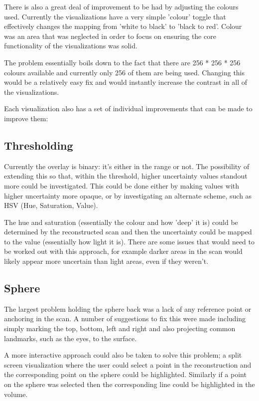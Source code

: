 There is also a great deal of improvement to be had by adjusting the colours used. Currently the visualizations have a very simple 'colour' toggle that effectively changes the mapping from 'white to black' to 'black to red'. Colour was an area that was neglected in order to focus on ensuring the core functionality of the visualizations was solid.

The problem essentially boils down to the fact that there are 256 * 256 * 256 colours available and currently only 256 of them are being used. Changing this would be a relatively easy fix and would instantly increase the contrast in all of the visualizations.

Each visualization also has a set of individual improvements that can be made to improve them:

\subsection*{Thresholding}
Currently the overlay is binary: it's either in the range or not. The possibility of extending this so that, within the threshold, higher uncertainty values standout more could be investigated. This could be done either by making values with higher uncertainty more opaque, or by investigating an alternate scheme, such as HSV (Hue, Saturation, Value). 

The hue and saturation (essentially the colour and how 'deep' it is) could be determined by the reconstructed scan and then the uncertainty could be mapped to the value (essentially how light it is). There are some issues that would need to be worked out with this approach, for example darker areas in the scan would likely appear more uncertain than light areas, even if they weren't.

\subsection*{Sphere}
The largest problem holding the sphere back was a lack of any reference point or anchoring in the scan. A number of suggestions to fix this were made including simply marking the top, bottom, left and right and also projecting common landmarks, such as the eyes, to the surface.

A more interactive approach could also be taken to solve this problem; a split screen visualization where the user could select a point in the reconstruction and the corresponding point on the sphere could be highlighted. Similarly if a point on the sphere was selected then the corresponding line could be highlighted in the volume.

